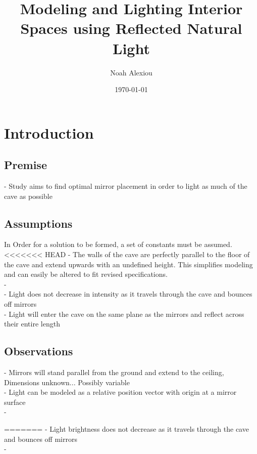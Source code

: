 \documentclass[11pt, letterpaper]{article}
\begin{document}
\title{Modeling and Lighting Interior Spaces using Reflected Natural Light}
\author{Noah Alexiou}
\date{\today}
\maketitle
\newpage
\tableofcontents
\newpage


\section{Introduction}


\subsection{Premise}
- Study aims to find optimal mirror placement in order to light as much of the cave as possible




\subsection{Assumptions}
\par
In Order for a solution to be formed, a set of constants must be assumed.
\\
<<<<<<< HEAD
- The walls of the cave are perfectly parallel to the floor of the cave and extend upwards with an undefined height. This simplifies modeling and can easily be altered to fit revised specifications.
\\
- 
\\
- Light does not decrease in intensity as it travels through the cave and bounces off mirrors
\\
- Light will enter the cave on the same plane as the mirrors and reflect across their entire length
\\


\subsection{Observations}
\par

- Mirrors will stand parallel from the ground and extend to the ceiling, Dimensions unknown... Possibly variable
\\
- Light can be modeled as a relative position vector with origin at a mirror surface
\\
- 

=======
- Light brightness does not decrease as it travels through the cave and bounces off mirrors
\\
-
\end{document}
